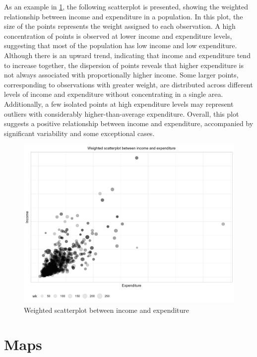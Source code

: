 \documentclass[
  12pt,
]{book}
\begin{document}
As an example in \ref{fig:ScatterIncome}, the following scatterplot is presented, showing the weighted relationship between income and expenditure in a population. In this plot, the size of the points represents the weight assigned to each observation. A high concentration of points is observed at lower income and expenditure levels, suggesting that most of the population has low income and low expenditure. Although there is an upward trend, indicating that income and expenditure tend to increase together, the dispersion of points reveals that higher expenditure is not always associated with proportionally higher income. Some larger points, corresponding to observations with greater weight, are distributed across different levels of income and expenditure without concentrating in a single area. Additionally, a few isolated points at high expenditure levels may represent outliers with considerably higher-than-average expenditure. Overall, this plot suggests a positive relationship between income and expenditure, accompanied by significant variability and some exceptional cases.

\begin{figure}
\includegraphics[width=33.33in]{www/05_graficas/02_scatterplot_ingreso_gasto} \caption{Weighted scatterplot between income and expenditure}\label{fig:ScatterIncome}
\end{figure}

\hypertarget{maps}{%
\section{Maps}\label{maps}}
\end{document}
